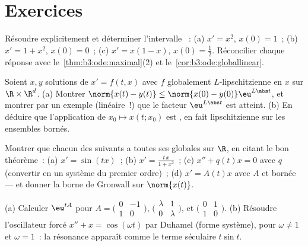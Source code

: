 \section{Exercices}

\begin{exercise}[$\star$]\label{exo:b3:ode:1}
Résoudre explicitement et déterminer l'intervalle ~:
(a) $x' = x^2$, $x(0) = 1$~; (b) $x' = 1 + x^2$, $x(0) = 0$~;
(c) $x' = x(1-x)$, $x(0) = \frac12$. Réconcilier chaque
réponse avec le~\cref{thm:b3:ode:maximal}(2) et
le~\cref{cor:b3:ode:globallinear}.
\end{exercise}

\begin{exercise}[$\star$]\label{exo:b3:ode:2}
Soient $x, y$ solutions de $x' = f(t,x)$ avec $f$
globalement $L$-lipschitzienne en $x$ sur $\R\times\R^d$.
(a) Montrer $\norm{x(t) - y(t)} \leq \norm{x(0) -
y(0)}\eu^{L\abs t}$, et montrer par un exemple (linéaire~!)
que le facteur $\eu^{L\abs t}$ est atteint.
(b) En déduire que l'application de  $x_0 \mapsto x(t;
x_0)$ est , en fait lipschitzienne sur les ensembles
bornés.
\end{exercise}

\begin{exercise}[$\star\star$]\label{exo:b3:ode:3}
Montrer que chacun des suivants a toutes ses  globales sur $\R$, en citant le bon théorème~:
(a) $x' = \sin(tx)$~;
(b) $x' = \frac{t\,x}{1 + x^2}$~;
(c) $x'' + q(t)x = 0$ avec $q$  (convertir en un
système du premier ordre)~;
(d) $x' = A(t)x$ avec $A$  et bornée --- et donner la
borne de Gronwall sur $\norm{x(t)}$.
\end{exercise}

\begin{exercise}[$\star\star$]\label{exo:b3:ode:4}
(a) Calculer $\eu^{tA}$ pour
$A = \bigl(\begin{smallmatrix}0 & -1\\ 1 &
0\end{smallmatrix}\bigr)$,
$\bigl(\begin{smallmatrix}\lambda & 1\\ 0 &
\lambda\end{smallmatrix}\bigr)$, et
$\bigl(\begin{smallmatrix}0 & 1\\ 1 &
0\end{smallmatrix}\bigr)$.
(b) Résoudre l'oscillateur forcé $x'' + x = \cos(\omega t)$
par Duhamel (forme système), pour $\omega \neq 1$ et $\omega
= 1$~: la résonance apparaît comme le terme séculaire $t\sin
t$.
\end{exercise}

